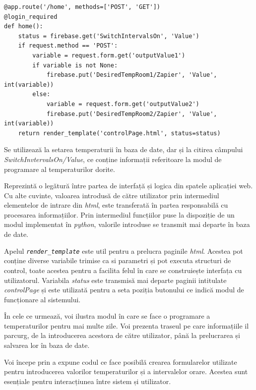 \vspace{1em}
\begin{lstlisting}
@app.route('/home', methods=['POST', 'GET'])
@login_required
def home():
    status = firebase.get('SwitchIntervalsOn', 'Value')
    if request.method == 'POST':
        variable = request.form.get('outputValue1')
        if variable is not None:
            firebase.put('DesiredTempRoom1/Zapier', 'Value', int(variable))
        else:
            variable = request.form.get('outputValue2')
            firebase.put('DesiredTempRoom2/Zapier', 'Value', int(variable))
    return render_template('controlPage.html', status=status)
\end{lstlisting}
\vspace{2em} 


	 Se utilizează la setarea temperaturii în baza de date, dar și la citirea câmpului \textit{SwitchInvtervalsOn/Value}, ce conține informații referitoare la modul de programare al temperaturilor dorite. 

	Reprezintă o legătură între partea de interfață și logica din spatele aplicației web. Cu alte cuvinte, valoarea introdusă de către utilizator prin intermediul elementelor de intrare din \textit{html}, este transferată în partea responsabilă cu procesarea informațiilor. Prin intermediul funcțiilor puse la dispoziție de un modul implementat în \textit{python}, valorile introduse se transmit mai departe în baza de date.

	Apelul \textit{\texttt{render\_template}} este util pentru a prelucra paginile \textit{html}. Acestea pot conține diverse variabile trimise ca si parametri și pot executa structuri de control, toate acestea pentru a facilita felul în care se construiește interfața cu utilizatorul. Variabila \textit{status} este transmisă mai departe paginii intitulate \textit{controlPage} și este utilizată pentru a seta poziția butonului ce indică modul de funcționare al sistemului.

\vspace{2em}

	În cele ce urmează, voi ilustra modul în care se face o programare a temperaturilor pentru mai multe zile. Voi prezenta traseul pe care informațiile il parcurg, de la introducerea acestora de către utilizator, până la prelucrarea și salvarea lor în baza de date.

	Voi începe prin a expune codul ce face posibilă crearea formularelor utilizate pentru introducerea valorilor temperaturilor și a intervalelor orare. Acestea sunt esențiale pentru interacțiunea între sistem și utilizator.  

